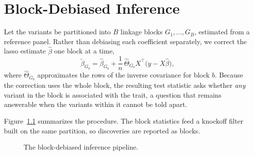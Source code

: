 \chapter{Block-Debiased Inference}
\label{ch:method}

Let the variants be partitioned into $B$ linkage blocks $G_1, \dots, G_B$, estimated from a
reference panel. Rather than debiasing each coefficient separately, we correct the lasso
estimate $\hat\beta$ one block at a time,
\begin{equation}
  \tilde\beta_{G_b} = \hat\beta_{G_b} + \frac{1}{n}\,\hat\Theta_{G_b} X^{\top}
  \bigl(y - X\hat\beta\bigr),
  \label{eq:blockdebias}
\end{equation}
where $\hat\Theta_{G_b}$ approximates the rows of the inverse covariance for block $b$. Because
the correction uses the whole block, the resulting test statistic asks whether \emph{any}
variant in the block is associated with the trait, a question that remains answerable when the
variants within it cannot be told apart.

Figure~\ref{fig:pipeline} summarizes the procedure. The block statistics feed a knockoff filter
built on the same partition, so discoveries are reported as blocks.

\begin{figure}[htbp]
  \centering
  \caption{The block-debiased inference pipeline.}
  \label{fig:pipeline}
\end{figure}
